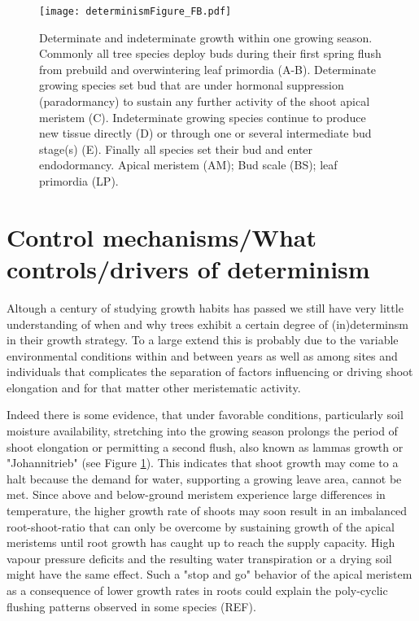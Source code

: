 \documentclass{article}
\begin{document}
	
								\begin{figure}
								\centering
								\texttt{[image: determinismFigure\_FB.pdf]} 
								\caption{Determinate and indeterminate growth within one growing season. Commonly all tree species deploy buds during their first spring flush from prebuild and overwintering leaf primordia (A-B). Determinate growing species set bud that are under hormonal suppression (paradormancy) to sustain any further activity of the shoot apical meristem (C). Indeterminate growing species continue to produce new tissue directly (D) or through one or several intermediate bud stage(s) (E). Finally all species set their bud and enter endodormancy. Apical meristem (AM); Bud scale (BS); leaf primordia (LP).}
								\label{fig:fig_2xxx}
								\end{figure}
	
\section*{Control mechanisms/What controls/drivers of determinism}
Altough a century of studying growth habits has passed we still have very little understanding of when and why trees exhibit a certain degree of (in)determinsm in their growth strategy. To a large extend this is probably due to the variable environmental conditions within and between years as well as among sites and individuals that complicates the separation of factors influencing or driving shoot elongation and for that matter other meristematic activity.

Indeed there is some evidence, that under favorable conditions, particularly soil moisture availability,  stretching into the growing season prolongs the period of shoot elongation or permitting a second flush, also known as lammas growth or "Johannitrieb" (see Figure \ref{fig:fig_2xxx}). This indicates that shoot growth may come to a halt because the demand for water, supporting a growing leave area, cannot be met. Since above and below-ground meristem experience large differences in temperature, the higher growth rate of shoots may soon result in an imbalanced root-shoot-ratio that can only be overcome by sustaining growth of the apical meristems until root growth has caught up to reach the supply capacity. High vapour pressure deficits and the resulting water transpiration or a drying soil might have the same effect. Such a "stop and go" behavior of the apical meristem as a  consequence of lower growth rates in roots could explain the poly-cyclic flushing patterns observed in some species (REF).\\
\end{document}
